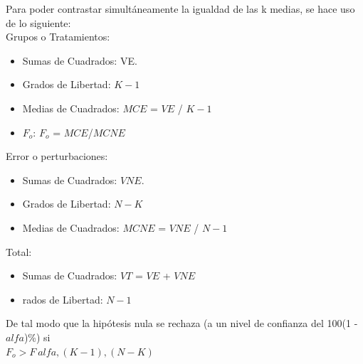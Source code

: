 \documentclass[12pt,letterpaper]{article}\usepackage[]{graphicx}\usepackage[]{color}
\begin{document}
Para poder contrastar simult\'aneamente la igualdad de las k medias, se hace uso de lo siguiente:\\

Grupos o Tratamientos:
\begin{itemize}
  \item Sumas de Cuadrados: VE.
  \item Grados de Libertad: $K-1$
  \item Medias de Cuadrados: $MCE$ = $VE$ / $K-1$ 
  \item $F_o$: $F_o$ = $MCE$/$MCNE$
\end{itemize}

Error o perturbaciones:
\begin{itemize}
  \item Sumas de Cuadrados: $VNE$.
  \item Grados de Libertad: $N - K$
  \item Medias de Cuadrados: $MCNE$ = $VNE$ / $N-1$ 
\end{itemize}

Total:
\begin{itemize}
  \item Sumas de Cuadrados: $VT$ = $VE$ + $VNE$
  \item rados de Libertad: $N - 1$
\end{itemize}

De tal modo que la hip\'otesis nula se rechaza (a un nivel de confianza del  100(1 - $alfa$)\%) si\\

$F_o$$>$$F_\ alfa,(K-1),(N-K)$
\end{document}
